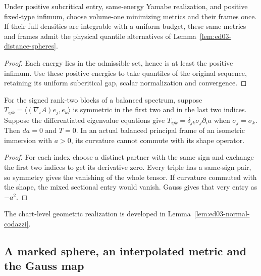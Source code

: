 \begin{corollary}
\label{lem:ed03-yamabe-quantiles}
\leanok
Under positive subcritical entry, same-energy Yamabe realization, and
positive fixed-type infimum, choose volume-one minimizing metrics and
their frames once. If their full densities are integrable with a uniform
budget, these same metrics and frames admit the physical quantile
alternatives of Lemma~\ref{lem:ed03-distance-spheres}.
\end{corollary}
\begin{proof}
\leanok
Each energy lies in the admissible set, hence is at least the positive
infimum. Use these positive energies to take quantiles of the original
sequence, retaining its uniform subcritical gap, scalar normalization
and convergence.
\end{proof}

\begin{lemma}
\label{lem:ed03-codazzi-jets}
\leanok
For the signed rank-two blocks of a balanced spectrum, suppose
\(T_{ijk}=\langle(\nabla_i A)e_j,e_k\rangle\) is symmetric in the first
two and in the last two indices. Suppose the differentiated eigenvalue
equations give \(T_{ijk}=\delta_{jk}\sigma_j\partial_i a\) when
\(\sigma_j=\sigma_k\). Then \(da=0\) and \(T=0\).
In an actual balanced principal frame of an isometric immersion with
\(a>0\), its curvature cannot commute with its shape operator.
\end{lemma}
\begin{proof}
\leanok
For each index choose a distinct partner with the same sign and exchange
the first two indices to get its derivative zero. Every triple has a
same-sign pair, so symmetry gives the vanishing of the whole tensor.
If curvature commuted with the shape, the mixed sectional entry would
vanish. Gauss gives that very entry as \(-a^2\).
\end{proof}
The chart-level geometric realization is developed in
Lemma~\ref{lem:ed03-normal-codazzi}.

\subsection{A marked sphere, an interpolated metric and the Gauss map}

